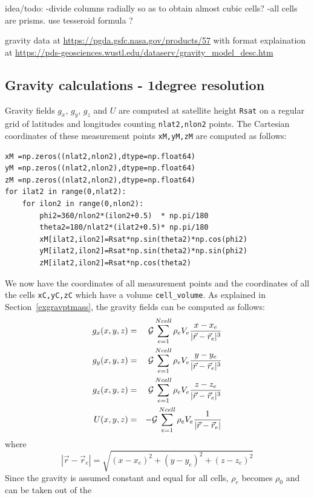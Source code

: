 idea/todo: 
-divide columns radially so as to obtain almost cubic cells?
-all cells are prisms. use tesseroid formula ?


gravity data at \url{https://pgda.gsfc.nasa.gov/products/57}
with format explaination at \url{https://pds-geosciences.wustl.edu/dataserv/gravity_model_desc.htm}


\subsection*{Gravity calculations - 1degree resolution}

Gravity fields $g_x$, $g_y$, $g_z$ and $U$ are computed at satellite height \lstinline{Rsat}
on a regular grid of latitudes and longitudes counting \lstinline{nlat2,nlon2} points. 
The Cartesian coordinates of these measurement points \lstinline{xM,yM,zM} 
are computed as follows:
\begin{lstlisting}
xM =np.zeros((nlat2,nlon2),dtype=np.float64)
yM =np.zeros((nlat2,nlon2),dtype=np.float64)
zM =np.zeros((nlat2,nlon2),dtype=np.float64)
for ilat2 in range(0,nlat2):
    for ilon2 in range(0,nlon2): 
        phi2=360/nlon2*(ilon2+0.5)  * np.pi/180
        theta2=180/nlat2*(ilat2+0.5)* np.pi/180
        xM[ilat2,ilon2]=Rsat*np.sin(theta2)*np.cos(phi2)
        yM[ilat2,ilon2]=Rsat*np.sin(theta2)*np.sin(phi2)
        zM[ilat2,ilon2]=Rsat*np.cos(theta2)
\end{lstlisting}
We now have the coordinates of all measurement points and the coordinates of all the 
cells \lstinline{xC,yC,zC} which have a volume \lstinline{cell_volume}.
As explained in Section~\ref{exgravptmass}, the gravity fields can be computed as 
follows:
\begin{eqnarray}
g_x(x,y,z) &=& {\cal G}  \sum_{e=1}^{Ncell} \rho_e V_e  \frac{x-x_e}{|\vec{r}-\vec{r}_e|^3} \label{eqq:gravdiscr1}\\
g_y(x,y,z) &=& {\cal G}  \sum_{e=1}^{Ncell} \rho_e V_e  \frac{y-y_e}{|\vec{r}-\vec{r}_e|^3} \label{eqq:gravdiscr2}\\
g_z(x,y,z) &=& {\cal G}  \sum_{e=1}^{Ncell} \rho_e V_e  \frac{z-z_e}{|\vec{r}-\vec{r}_e|^3} \label{eqq:gravdiscr3}\\
U(x,y,z)   &=& -{\cal G} \sum_{e=1}^{Ncell} \rho_e V_e  \frac{1}{|\vec{r}-\vec{r}_e|}       \label{eqq:gravdiscr4}
\end{eqnarray}
where 
\[
|\vec{r}-\vec{r}_e|=\sqrt{ (x-x_e)^2+(y-y_e)^2+(z-z_e)^2   }
\]
Since the gravity is assumed constant and equal for all cells, $\rho_e$ becomes $\rho_0$ and can be taken out of the 
